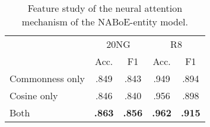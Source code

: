 \documentclass[11pt,a4paper]{article}
\begin{document}
    \begin{table}[t]
        \centering
        \begin{tabular}{l|cc|cc}
            \multirow{2}{*}{} & \multicolumn{2}{c|}{20NG} & \multicolumn{2}{c}{R8}\\
            & Acc. & F1 & Acc. & F1\\
            \hline
            Commonness only           & .849          & .843          & .949          & .894 \\
            Cosine only               & .846          & .840          & .956          & .898 \\
            Both                      & \textbf{.863} & \textbf{.856} & \textbf{.962} & \textbf{.915} \\
        \end{tabular}
        \caption{Feature study of the neural attention mechanism of the NABoE-entity model.}
        \label{tb:attention-feature-study}
    \end{table}
\end{document}
